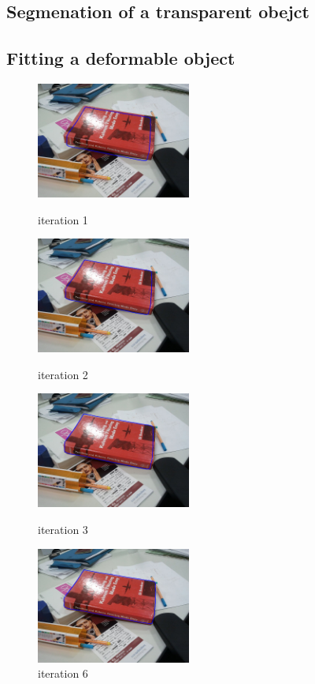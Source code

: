 \subsection{Segmenation of a transparent obejct}
\label{sec:sto}

\subsection{Fitting a deformable object}
\label{sec:fdo}
\begin{figure} 
  \begin{minipage}[t]{0.45\linewidth} 
    \centering 
    \includegraphics[width=2.0in]{images/book/0.png} 
    \caption{iteration 1} 
    \label{fig:side:a} 
  \end{minipage}%
  \begin{minipage}[t]{0.45\linewidth} 
    \centering 
    \includegraphics[width=2.0in]{images/book/1.png} 
    \caption{iteration 2} 
    \label{fig:side:b} 
  \end{minipage} 
  \begin{minipage}[t]{0.45\linewidth} 
    \centering 
    \includegraphics[width=2.0in]{images/book/2.png} 
    \caption{iteration 3} 
    \label{fig:side:c} 
  \end{minipage} 
  \begin{minipage}[t]{0.45\linewidth} 
    \centering 
    \includegraphics[width=2.0in]{images/book/13.png} 
    \caption{iteration 6} 
    \label{fig:side:d} 
  \end{minipage} 
\end{figure}


